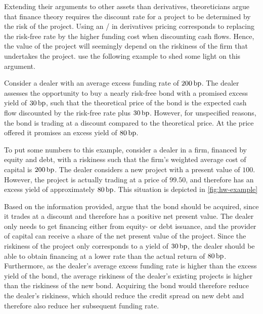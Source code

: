 \documentclass[main.tex]{subfiles}
\begin{document}
            Extending their arguments to other assets than derivatives, 
            theoreticians argue that finance theory requires the discount rate for a project 
            to be determined by the risk of the project.
            Using an \FVA/ in derivatives pricing corresponds to replacing the risk-free rate by the higher funding cost
            when discounting cash flows.
            Hence, the value of the project will seemingly depend on the riskiness of the firm that undertakes the project.
            \textcite{HullWhite2012FVA} use the following example to shed some light on this argument.

            \begin{example}
            Consider a dealer with an average excess funding rate of $200\,\text{bp}$. 
            The dealer assesses the opportunity to buy a nearly risk-free bond with a promised excess yield of $30\,\text{bp}$,
            such that the theoretical price of the bond is the expected cash flow 
            discounted by the risk-free rate plus $30\,\text{bp}$.
            However, for unspecified reasons, the bond is trading at a discount compared to the theoretical price.
            At the price offered it promises an excess yield of $80\,\text{bp}$.
            
            To put some numbers to this example,
            consider a dealer in a firm,
            financed by equity and debt, 
            with a riskiness such that the firm's weighted average cost of capital is $200\,\text{bp}$.
            The dealer considers a new project with a present value of $100$.
            However, the project is actually trading at a price of $99.50$,
            and therefore has an excess yield of approximately $80\,\text{bp}$.
            This situation is depicted in \cref{fig:hw-example}

            Based on the information provided, \textcite{HullWhite2012FVA} argue that the bond should be acquired,
            since it trades at a discount and therefore has a positive net present value.
            The dealer only needs to get financing either from equity- or debt issuance,
            and the provider of capital can receive a share of the net present value of the project.
            Since the riskiness of the project only corresponds to a yield of $30\,\text{bp}$,
            the dealer should be able to obtain financing at a lower rate 
            than the actual return of $80\,\text{bp}$.
            Furthermore, as the dealer's average excess funding rate is higher than the excess yield of the bond, 
            the average riskiness of the dealer's existing projects is higher than the riskiness of the new bond.
            Acquiring the bond would therefore reduce the dealer's riskiness,
            which should reduce the credit spread on new debt and therefore also reduce her subsequent funding rate.
            \end{example}
\end{document}
